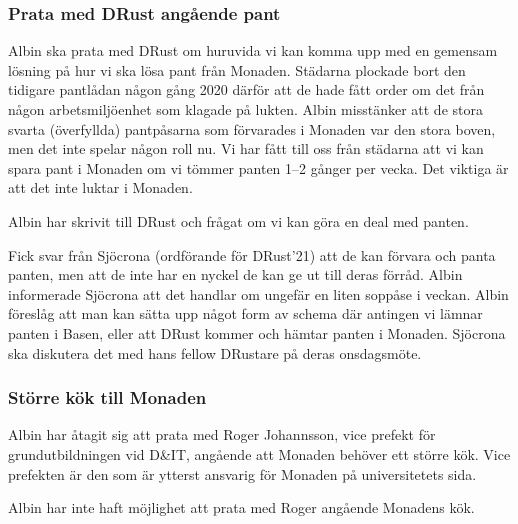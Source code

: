 \documentclass[protokoll]{dvd}
\begin{document}
\subsubsection{Prata med DRust angående pant}

Albin ska prata med DRust om huruvida vi kan komma upp med en gemensam lösning på hur vi ska lösa pant från Monaden.
Städarna plockade bort den tidigare pantlådan någon gång 2020 därför att de hade fått order om det från någon arbetsmiljöenhet som klagade på lukten.
Albin misstänker att de stora svarta (överfyllda) pantpåsarna som förvarades i Monaden var den stora boven, men det inte spelar någon roll nu.
Vi har fått till oss från städarna att vi kan spara pant i Monaden om vi tömmer panten 1--2 gånger per vecka.
Det viktiga är att det inte luktar i Monaden.

\begin{description}[style=multiline, widest=00.00, align=left, leftmargin=2.5cm]
    \item[2021-08-25] Albin har skrivit till DRust och frågat om vi kan göra en deal med panten.

    \item[2021-09-20] Fick svar från Sjöcrona (ordförande för DRust'21) att de kan förvara och panta panten, men att de inte har en nyckel de kan ge ut till deras förråd.
    Albin informerade Sjöcrona att det handlar om ungefär en liten soppåse i veckan.
    Albin föreslåg att man kan sätta upp något form av schema där antingen vi lämnar panten i Basen, eller att DRust kommer och hämtar panten i Monaden.
    Sjöcrona ska diskutera det med hans fellow DRustare på deras onsdagsmöte.
\end{description}

\subsubsection{Större kök till Monaden}

Albin har åtagit sig att prata med Roger Johannsson, vice prefekt för grundutbildningen vid D\&IT, angående att Monaden behöver ett större kök.
Vice prefekten är den som är ytterst ansvarig för Monaden på universitetets sida.

\begin{description}[style=multiline, widest=00.00, align=left, leftmargin=2.5cm]
    \item[2021-09-21] Albin har inte haft möjlighet att prata med Roger angående Monadens kök.
\end{description}
\end{document}
